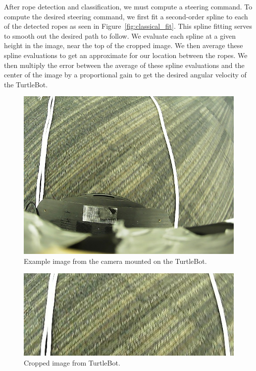 After rope detection and classification, we must compute a steering command. To
compute the desired steering command, we first fit a second-order spline to each
of the detected ropes as seen in Figure~\ref{fig:classical_fit}. This spline
fitting serves to smooth out the desired path to follow. We evaluate each spline
at a given height in the image, near the top of the cropped image. We then
average these spline evaluations to get an approximate for our location between
the ropes. We then multiply the error between the average of these spline
evaluations and the center of the image by a proportional gain to get the
desired angular velocity of the TurtleBot.

\begin{figure}
  \centering
  \includegraphics[scale=0.5]{figures/raw_img.png}
  \caption{Example image from the camera mounted on the TurtleBot.}
  \label{fig:raw_img}
\end{figure}

\begin{figure}
  \centering
  \includegraphics[scale=0.67]{figures/classical_crop.jpg}
  \caption{Cropped image from TurtleBot.}
  \label{fig:classical_crop}
\end{figure}

